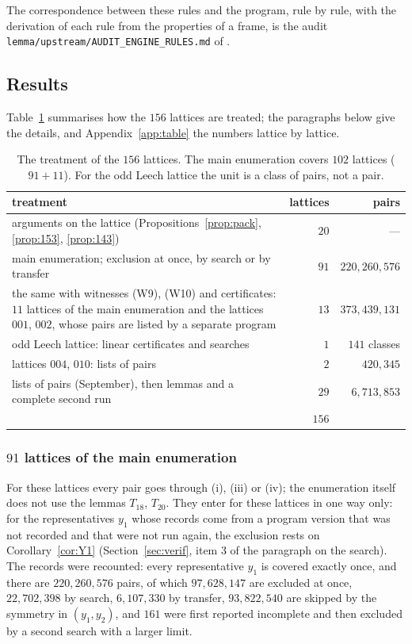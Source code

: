 \documentclass[11pt]{amsart}
\theoremstyle{definition}
\theoremstyle{remark}
\begin{document}
\medskip
The correspondence between these rules and the program, rule by rule, with the derivation of each rule from the properties
of a frame, is the audit \texttt{lemma/upstream/AUDIT\_ENGINE\_RULES.md} of \cite{repo}.

\subsection{Results}\label{ssec:results}

Table~\ref{tab:methods} summarises how the $156$ lattices are treated; the paragraphs below give the details, and
Appendix~\ref{app:table} the numbers lattice by lattice.

\begin{table}[ht]
\centering\small
\begin{tabular}{p{88mm}rr}
\toprule
treatment & lattices & pairs\\
\midrule
arguments on the lattice (Propositions~\ref{prop:pack}, \ref{prop:153}, \ref{prop:143}) & $20$ & ---\\
main enumeration; exclusion at once, by search or by transfer & $91$ & $220{,}260{,}576$\\
the same with witnesses (W9), (W10) and certificates: $11$ lattices of the main enumeration and the lattices $001$,
$002$, whose pairs are listed by a separate program & $13$ & $373{,}439{,}131$\\
odd Leech lattice: linear certificates and searches & $1$ & $141$ classes\\
lattices $004$, $010$: lists of pairs & $2$ & $420{,}345$\\
lists of pairs (September), then lemmas and a complete second run & $29$ & $6{,}713{,}853$\\
\midrule
 & $156$ & \\
\bottomrule
\end{tabular}
\caption{The treatment of the $156$ lattices. The main enumeration covers $102$ lattices ($91+11$). For the odd Leech
lattice the unit is a class of pairs, not a pair.}\label{tab:methods}
\end{table}

\subsubsection*{$91$ lattices of the main enumeration} For these lattices every pair goes through (i), (iii) or (iv); the
enumeration itself does not use the lemmas $T_{18}$, $T_{20}$. They enter for these lattices in one way only: for the
representatives $y_1$ whose records come from a program version that was not recorded and that were not run again, the
exclusion rests on Corollary~\ref{cor:Y1} (Section~\ref{sec:verif}, item 3 of the paragraph on the search). The records
were recounted: every representative $y_1$ is covered exactly once, and
there are $220{,}260{,}576$ pairs, of which $97{,}628{,}147$ are excluded at once, $22{,}702{,}398$ by search,
$6{,}107{,}330$ by transfer, $93{,}822{,}540$ are skipped by the symmetry in $(y_1,y_2)$, and $161$ were first reported
incomplete and then excluded by a second search with a larger limit.
\end{document}
